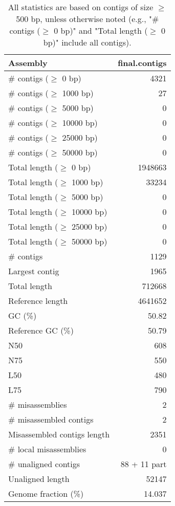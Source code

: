 \documentclass[12pt,a4paper]{article}
\begin{document}
\begin{table}[ht]
\begin{center}
\caption{All statistics are based on contigs of size $\geq$ 500 bp, unless otherwise noted (e.g., "\# contigs ($\geq$ 0 bp)" and "Total length ($\geq$ 0 bp)" include all contigs).}
\begin{tabular}{|l*{1}{|r}|}
\hline
Assembly & final.contigs \\ \hline
\# contigs ($\geq$ 0 bp) & 4321 \\ \hline
\# contigs ($\geq$ 1000 bp) & 27 \\ \hline
\# contigs ($\geq$ 5000 bp) & 0 \\ \hline
\# contigs ($\geq$ 10000 bp) & 0 \\ \hline
\# contigs ($\geq$ 25000 bp) & 0 \\ \hline
\# contigs ($\geq$ 50000 bp) & 0 \\ \hline
Total length ($\geq$ 0 bp) & 1948663 \\ \hline
Total length ($\geq$ 1000 bp) & 33234 \\ \hline
Total length ($\geq$ 5000 bp) & 0 \\ \hline
Total length ($\geq$ 10000 bp) & 0 \\ \hline
Total length ($\geq$ 25000 bp) & 0 \\ \hline
Total length ($\geq$ 50000 bp) & 0 \\ \hline
\# contigs & 1129 \\ \hline
Largest contig & 1965 \\ \hline
Total length & 712668 \\ \hline
Reference length & 4641652 \\ \hline
GC (\%) & 50.82 \\ \hline
Reference GC (\%) & 50.79 \\ \hline
N50 & 608 \\ \hline
N75 & 550 \\ \hline
L50 & 480 \\ \hline
L75 & 790 \\ \hline
\# misassemblies & 2 \\ \hline
\# misassembled contigs & 2 \\ \hline
Misassembled contigs length & 2351 \\ \hline
\# local misassemblies & 0 \\ \hline
\# unaligned contigs & 88 + 11 part \\ \hline
Unaligned length & 52147 \\ \hline
Genome fraction (\%) & 14.037 \\ \hline

\end{tabular}
\end{center}
\end{table}
\end{document}
